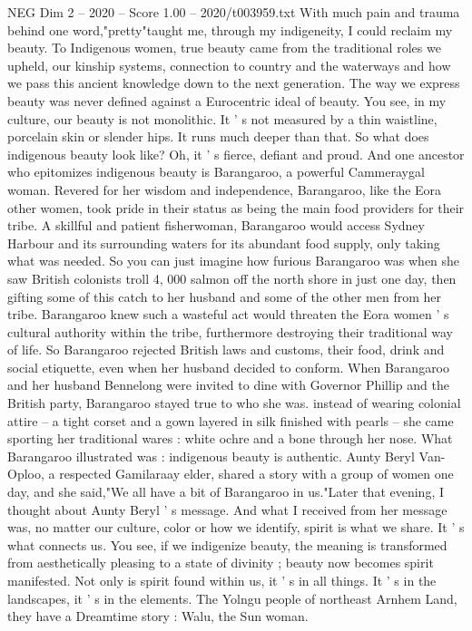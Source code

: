 \begin{textsample}{NEG Dim 2 – 2020 – Score 1.00 – 2020/t003959.txt}
With much pain and trauma behind one word,"pretty"taught me, through my indigeneity, I could reclaim my beauty.
To Indigenous women, true beauty came from the traditional roles we upheld, our kinship systems, connection to country and the waterways and how we pass this ancient knowledge down to the next generation.
The way we express beauty was never defined against a Eurocentric ideal of beauty.
You see, in my culture, our beauty is not monolithic.
It ' s not measured by a thin waistline, porcelain skin or slender hips.
It runs much deeper than that.
So what does indigenous beauty look like?
Oh, it ' s fierce, defiant and proud.
And one ancestor who epitomizes indigenous beauty is Barangaroo, a powerful Cammeraygal woman.
Revered for her wisdom and independence, Barangaroo, like the Eora other women, took pride in their status as being the main food providers for their tribe.
A skillful and patient fisherwoman, Barangaroo would access Sydney Harbour and its surrounding waters for its abundant food supply, only taking what was needed.
So you can just imagine how furious Barangaroo was when she saw British colonists troll 4, 000 salmon off the north shore in just one day, then gifting some of this catch to her husband and some of the other men from her tribe.
Barangaroo knew such a wasteful act would threaten the Eora women ' s cultural authority within the tribe, furthermore destroying their traditional way of life.
So Barangaroo rejected British laws and customs, their food, drink and social etiquette, even when her husband decided to conform.
When Barangaroo and her husband Bennelong were invited to dine with Governor Phillip and the British party, Barangaroo stayed true to who she was. instead of wearing colonial attire -- a tight corset and a gown layered in silk finished with pearls -- she came sporting her traditional wares : white ochre and a bone through her nose.
What Barangaroo illustrated was : indigenous beauty is authentic.
Aunty Beryl Van-Oploo, a respected Gamilaraay elder, shared a story with a group of women one day, and she said,"We all have a bit of Barangaroo in us."Later that evening, I thought about Aunty Beryl ' s message.
And what I received from her message was, no matter our culture, color or how we identify, spirit is what we share.
It ' s what connects us.
You see, if we indigenize beauty, the meaning is transformed from aesthetically pleasing to a state of divinity ; beauty now becomes spirit manifested.
Not only is spirit found within us, it ' s in all things.
It ' s in the landscapes, it ' s in the elements.
The Yolngu people of northeast Arnhem Land, they have a Dreamtime story : Walu, the Sun woman.

\end{textsample}
